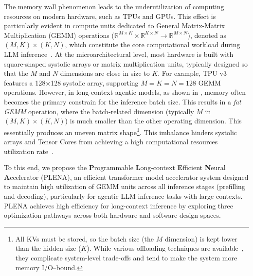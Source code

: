 The memory wall phenomenon leads to the underutilization of computing resources on modern hardware, such as TPUs and GPUs. This effect is particularly evident in compute units dedicated to General Matrix-Matrix Multiplication (GEMM) operations ($\mathbb{R}^{M \times K} \times \mathbb{R}^{K \times N} \to \mathbb{R}^{M \times N}$), denoted as $(M, K) \times (K, N)$, which constitute the core computational workload during LLM inference~\cite{Transistive}.
At the microarchitectural level, most hardware is built with square-shaped systolic arrays or matrix multiplication units, typically designed so that the $M$ and $N$ dimensions are close in size to $K$. For example, TPU v3~\cite{TPU_V3_Systolic_Array} features a 128×128 systolic array, supporting $M = K = N = 128$ GEMM operations. 
However, in long-context agentic models, as shown in , memory often becomes the primary constrain for the inference batch size. This results in a \textit{fat GEMM} operation, where the batch-related dimension (typically $M$ in $(M,K)\times(K,N)$) is much smaller than the other operating dimension. This essentially produces an uneven matrix shape\footnote{All KVs must be stored, so the batch size (the \(M\) dimension) is kept lower than the hidden size (\(K\)). While various offloading techniques are available~\cite{deepspeedinference}, they complicate system-level trade-offs and tend to make the system more memory I/O--bound.}. This imbalance hinders systolic arrays and Tensor Cores from achieving a high computational resources utilization rate~\cite{FlashDecoding}.



To this end, we propose the \textbf{P}rogrammable \textbf{L}ong-context \textbf{E}fficient \textbf{N}eural \textbf{A}ccelerator (PLENA), an efficient transformer model accelerator system designed to maintain high utilization of GEMM units across all inference stages (prefilling and decoding), particularly for agentic LLM inference tasks with large contexts. PLENA achieves high efficiency for long-context inference by exploring three optimization pathways across both hardware and software design spaces. 


